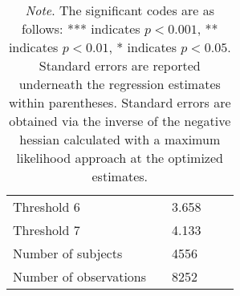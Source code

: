 \documentclass[12pt]{article}
\begin{document}
\begin{table}[h!]
\begin{tabular}{ll l l l}
Threshold 6                 &               &  3.658         &&\\
Threshold 7                 &               &  4.133         &&\\
Number of subjects          &               &  4556          &&\\
Number of observations      &               &  8252          &&\\
\hline
\end{tabular}
\caption*{\footnotesize{\textit{Note}. The significant codes are as follows: *** indicates $p < 0.001$, ** indicates $p < 0.01$, * indicates $p <0.05$. Standard errors are reported underneath the regression estimates within parentheses. Standard errors are obtained via the inverse of the negative hessian calculated with a maximum likelihood approach at the optimized estimates.}}
\end{table}
\end{document}
